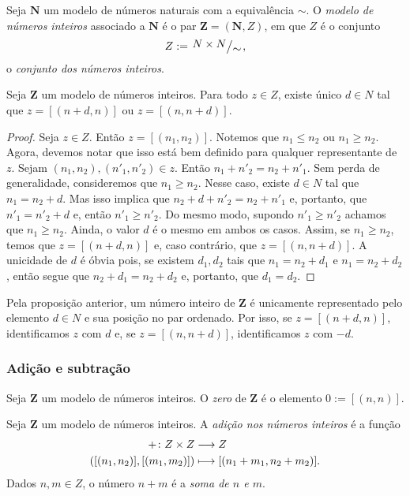 \begin{definition}
	Seja $\bm N$ um modelo de números naturais com a equivalência $\sim$. O \emph{modelo de números inteiros} associado a $\bm N$ é o par $\bm Z = (\bm N,Z)$, em que $Z$ é o conjunto 
	\begin{equation*}
	Z := \quo{N \times N}{\sim},
	\end{equation*}
o \emph{conjunto dos números inteiros}.
\end{definition}

\begin{proposition}
	Seja $\bm Z$ um modelo de números inteiros. Para todo $z \in Z$, existe único $d \in N$ tal que $z=[(n+d,n)]$ ou $z=[(n,n+d)]$.
\end{proposition}
\begin{proof}
	Seja $z \in Z$. Então $z=[(n_1,n_2)]$. Notemos que $n_1 \leq n_2$ ou $n_1 \geq n_2$. Agora, devemos notar que isso está bem definido para qualquer representante de $z$. Sejam $(n_1,n_2),(n'_1,n'_2) \in z$. Então $n_1+n'_2=n_2+n'_1$. Sem perda de generalidade, consideremos que $n_1 \geq n_2$. Nesse caso, existe $d \in N$ tal que $n_1=n_2+d$. Mas isso implica que $n_2+d+n'_2=n_2+n'_1$ e, portanto, que $n'_1=n'_2+d$ e, então $n'_1 \geq n'_2$. Do mesmo modo, supondo $n'_1 \geq n'_2$ achamos que $n_1 \geq n_2$. Ainda, o valor $d$ é o mesmo em ambos os casos. Assim, se $n_1 \geq n_2$, temos que $z=[(n+d,n)]$ e, caso contrário, que $z=[(n,n+d)]$. A unicidade de $d$ é óbvia pois, se existem $d_1,d_2$ tais que $n_1=n_2+d_1$ e $n_1=n_2+d_2$, então segue que $n_2+d_1=n_2+d_2$ e, portanto, que $d_1=d_2$.
\end{proof}

	Pela proposição anterior, um número inteiro de $\bm Z$ é unicamente representado pelo elemento $d \in N$ e sua posição no par ordenado. Por isso, se $z=[(n+d,n)]$, identificamos $z$ com $d$ e, se $z=[(n,n+d)]$, identificamos $z$ com $-d$.


\subsubsection{Adição e subtração}

\begin{definition}
Seja $\bm Z$ um modelo de números inteiros. O \emph{zero} de $\bm Z$ é o elemento $0 := [(n,n)]$.
\end{definition}

\begin{definition}
Seja $\bm Z$ um modelo de números inteiros. A \emph{adição nos números inteiros} é a função
	\begin{align*}
	{+}\colon {Z \times Z} &\longrightarrow {Z} \\{([(n_1,n_2)],[(m_1,m_2)])} &\longmapsto [(n_1+m_1,n_2+m_2)].
	\end{align*}
Dados $n,m \in Z$, o número $n+m$ é a \emph{soma de $n$ e $m$}.
\end{definition}

